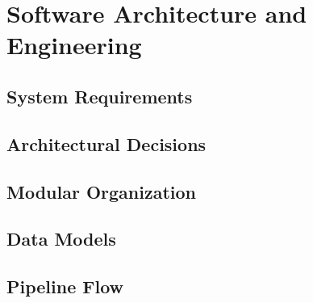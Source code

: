 \chapter{Software Architecture and Engineering}
\label{chap:software_architecture}

\section{System Requirements}
\label{sec:system_requirements}

\section{Architectural Decisions}
\label{sec:architectural_decisions}

\section{Modular Organization}
\label{sec:modular_organization}

\section{Data Models}
\label{sec:data_models}

\section{Pipeline Flow}
\label{sec:pipeline_flow}

